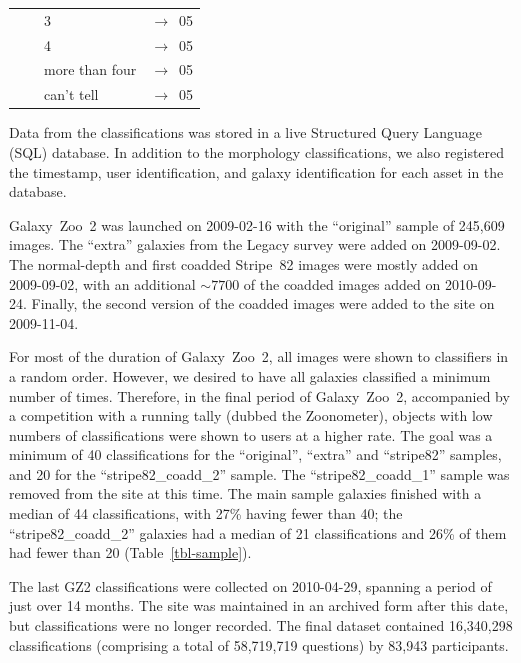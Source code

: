\documentclass[useAMS,usenatbib]{mn2e}
\begin{document}
\begin{table}
\begin{tabular}{@{}cllr}
      & {\it                               }  & 3                & $\rightarrow$~05 \\
      & {\it                               }  & 4                & $\rightarrow$~05 \\
      & {\it                               }  & more than four   & $\rightarrow$~05 \\
      & {\it                               }  & can't tell       & $\rightarrow$~05 \\
\hline
 \end{tabular}
\end{table}

Data from the classifications was stored in a live Structured Query Language (SQL) database. In addition to the morphology classifications, we also registered the timestamp, user identification, and galaxy identification for each asset in the database. 

Galaxy~Zoo~2 was launched on 2009-02-16 with the ``original'' sample of 245,609 images. The ``extra'' galaxies from the Legacy survey were added on 2009-09-02. The normal-depth and first coadded Stripe~82 images were mostly added on 2009-09-02, with an additional $\sim7700$ of the coadded images added on 2010-09-24. Finally, the second version of the coadded images were added to the site on 2009-11-04. 

For most of the duration of Galaxy~Zoo~2, all images were shown to classifiers in a random order. However, we desired to have all galaxies classified a minimum number of times. Therefore, in the final period of Galaxy~Zoo~2, accompanied by a competition with a running tally (dubbed the Zoonometer), objects with low numbers of classifications were shown to users at a higher rate. The goal was a minimum of 40 classifications for the ``original'', ``extra'' and ``stripe82'' samples, and 20 for the ``stripe82\_coadd\_2'' sample. The ``stripe82\_coadd\_1'' sample was removed from the site at this time. The main sample galaxies finished with a median of 44 classifications, with 27\% having fewer than 40; the ``stripe82\_coadd\_2'' galaxies had a median of 21 classifications and 26\% of them had fewer than 20 (Table~\ref{tbl-sample}). 

The last GZ2 classifications were collected on 2010-04-29, spanning a period of just over 14 months. The site was maintained in an archived form after this date, but classifications were no longer recorded. The final dataset contained 16,340,298 classifications (comprising a total of 58,719,719 questions) by 83,943 participants.
\end{document}
